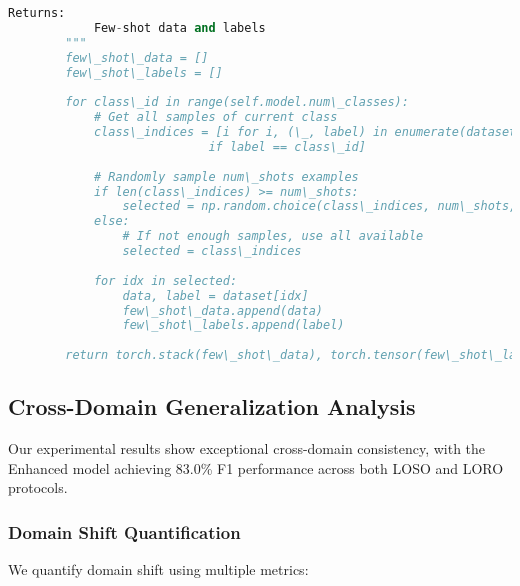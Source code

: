\documentclass[journal]{IEEEtran}
\begin{document}
\begin{lstlisting}[language=Python, caption=Progressive Few-Shot Learning Strategy]
        Returns:
            Few-shot data and labels
        """
        few\_shot\_data = []
        few\_shot\_labels = []
        
        for class\_id in range(self.model.num\_classes):
            # Get all samples of current class
            class\_indices = [i for i, (\_, label) in enumerate(dataset) 
                            if label == class\_id]
            
            # Randomly sample num\_shots examples
            if len(class\_indices) >= num\_shots:
                selected = np.random.choice(class\_indices, num\_shots, replace=False)
            else:
                # If not enough samples, use all available
                selected = class\_indices
            
            for idx in selected:
                data, label = dataset[idx]
                few\_shot\_data.append(data)
                few\_shot\_labels.append(label)
        
        return torch.stack(few\_shot\_data), torch.tensor(few\_shot\_labels)
\end{lstlisting}

\subsection{Cross-Domain Generalization Analysis}

Our experimental results show exceptional cross-domain consistency, with the Enhanced model achieving 83.0\% F1 performance across both LOSO and LORO protocols.

\subsubsection{Domain Shift Quantification}

We quantify domain shift using multiple metrics:
\end{document}
